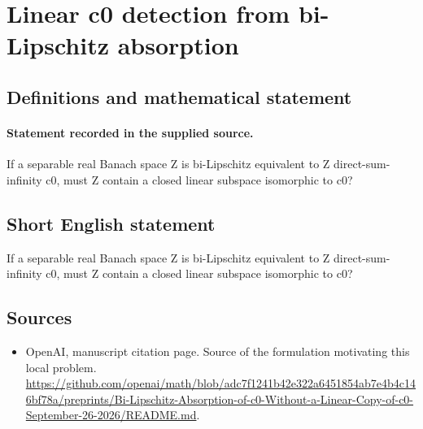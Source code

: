 \documentclass[11pt]{article}
\begin{document}
\section*{Linear c0 detection from bi-Lipschitz absorption}\label{statement}
\subsection{Definitions and mathematical statement}
\paragraph{Statement recorded in the supplied source.}
If a separable real Banach space Z is bi-Lipschitz equivalent to Z direct-sum-infinity c0, must Z contain a closed linear subspace isomorphic to c0?
\subsection{Short English statement}
If a separable real Banach space Z is bi-Lipschitz equivalent to Z direct-sum-infinity c0, must Z contain a closed linear subspace isomorphic to c0?
\subsection{Sources}
\begin{itemize}
\item[S1] OpenAI, manuscript citation page. Source of the formulation motivating this local problem.
\url{https://github.com/openai/math/blob/adc7f1241b42e322a6451854ab7e4b4c146bf78a/preprints/Bi-Lipschitz-Absorption-of-c0-Without-a-Linear-Copy-of-c0-September-26-2026/README.md}.
\end{itemize}
\end{document}
